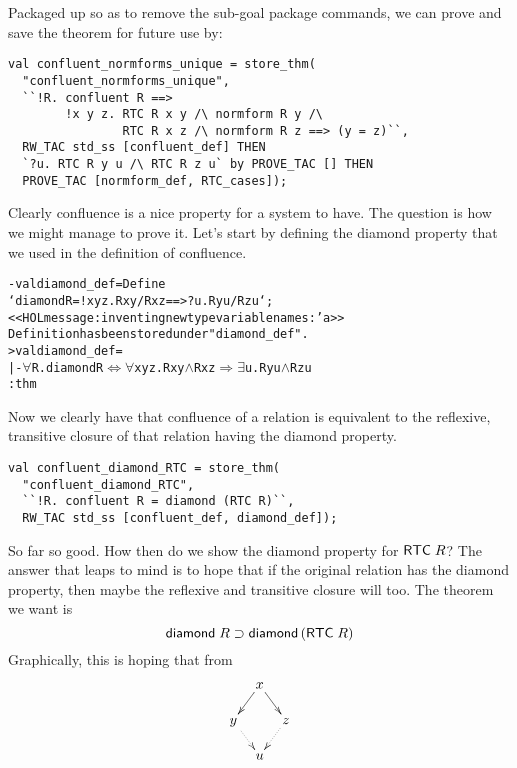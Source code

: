 Packaged up so as to remove the sub-goal package commands, we can
prove and save the theorem for future use by:
\begin{session}
\begin{verbatim}
val confluent_normforms_unique = store_thm(
  "confluent_normforms_unique",
  ``!R. confluent R ==>
        !x y z. RTC R x y /\ normform R y /\
                RTC R x z /\ normform R z ==> (y = z)``,
  RW_TAC std_ss [confluent_def] THEN
  `?u. RTC R y u /\ RTC R z u` by PROVE_TAC [] THEN
  PROVE_TAC [normform_def, RTC_cases]);
\end{verbatim}
\end{session}
\eos{}

Clearly confluence is a nice property for a system to have.  The
question is how we might manage to prove it.  Let's start by defining
the diamond property that we used in the definition of confluence.
\begin{session}
\begin{alltt}
- val diamond_def = Define
    `diamond R = !x y z. R x y /\bs R x z ==> ?u. R y u /\bs R z u`;
<<HOL message: inventing new type variable names: 'a>>
Definition has been stored under "diamond_def".
> val diamond_def =
    |- \(\forall\)R. diamond R \(\Leftrightarrow\) \(\forall\)x y z. R x y \(\land\) R x z \(\Rightarrow\) \(\exists\)u. R y u \(\land\) R z u
     : thm
\end{alltt}
\end{session}
    Now we clearly have that confluence of a relation is equivalent to
    the reflexive, transitive closure of that relation having the
    diamond property.
\begin{session}
\begin{verbatim}
val confluent_diamond_RTC = store_thm(
  "confluent_diamond_RTC",
  ``!R. confluent R = diamond (RTC R)``,
  RW_TAC std_ss [confluent_def, diamond_def]);
\end{verbatim}
\end{session}
    So far so good.  How then do we show the diamond property for
    ${\sf RTC}\;R$?  The answer that leaps to mind is to hope that if
    the original relation has the diamond property, then maybe the
    reflexive and transitive closure will too.  The theorem we want is
    \[ {\sf diamond}\;R \supset {\sf diamond}\,({\sf RTC}\;R)\] Graphically,
    this is hoping that from
    \[\xymatrix @R=5mm @C=2.5mm {
& x \ar[dl] \ar[dr] & \\
y \ar@{.>}[dr] & & z \ar@{.>}[dl] \\
& u}\]
